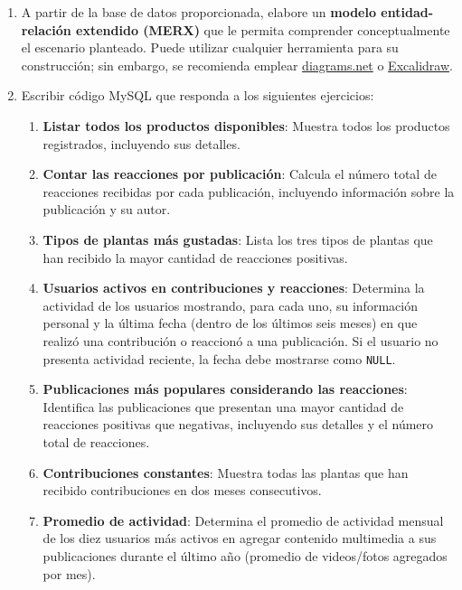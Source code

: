 \documentclass[10pt]{article}
\begin{document}
	\begin{enumerate}
		\item A partir de la base de datos proporcionada, elabore un \textbf{modelo entidad-relación extendido (MERX)} que le permita comprender conceptualmente el escenario planteado. 
		Puede utilizar cualquier herramienta para su construcción; sin embargo, se recomienda emplear 
		\href{https://app.diagrams.net/?src=about}{diagrams.net} o 
		\href{https://excalidraw.com/}{Excalidraw}.
		
		\item Escribir código MySQL que responda a los siguientes ejercicios:
		
		\begin{enumerate}
            \item \textbf{Listar todos los productos disponibles}: Muestra todos los productos registrados, incluyendo sus detalles.
        
            \item \textbf{Contar las reacciones por publicación}: Calcula el número total de reacciones recibidas por cada publicación, incluyendo información sobre la publicación y su autor.
        
            \item \textbf{Tipos de plantas más gustadas}: Lista los tres tipos de plantas que han recibido la mayor cantidad de reacciones positivas.
        
            \item \textbf{Usuarios activos en contribuciones y reacciones}: Determina la actividad de los usuarios mostrando, para cada uno, su información personal y la última fecha (dentro de los últimos seis meses) en que realizó una contribución o reaccionó a una publicación. Si el usuario no presenta actividad reciente, la fecha debe mostrarse como \texttt{NULL}.
        
            \item \textbf{Publicaciones más populares considerando las reacciones}: Identifica las publicaciones que presentan una mayor cantidad de reacciones positivas que negativas, incluyendo sus detalles y el número total de reacciones.
        
            \item \textbf{Contribuciones constantes}: Muestra todas las plantas que han recibido contribuciones en dos meses consecutivos.
        
            \item \textbf{Promedio de actividad}: Determina el promedio de actividad mensual de los diez usuarios más activos en agregar contenido multimedia a sus publicaciones durante el último año (promedio de videos/fotos agregados por mes).
        

\end{enumerate}
\end{enumerate}
\end{document}
